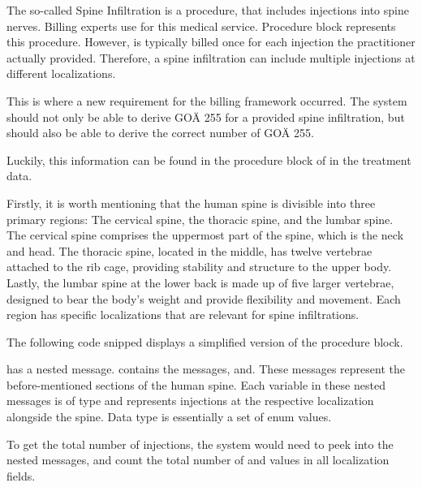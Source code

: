 The so-called Spine Infiltration is a procedure, that includes injections into spine nerves.
Billing experts use  for this medical service.
Procedure block  represents this procedure.
However,  is typically billed once for each injection the practitioner actually provided.
Therefore, a spine infiltration can include multiple injections at different localizations.

This is where a new requirement for the billing framework occurred.
The system should not only be able to derive GOÄ 255 for a provided spine infiltration, but should also be able to derive the correct number of GOÄ 255.

Luckily, this information can be found in the procedure block of in the treatment data.

Firstly, it is worth mentioning that the human spine is divisible into three primary regions:
The cervical spine, the thoracic spine, and the lumbar spine.
The cervical spine comprises the uppermost part of the spine, which is the neck and head.
The thoracic spine, located in the middle, has twelve vertebrae attached to the rib cage, providing stability and structure to the upper body.
Lastly, the lumbar spine at the lower back is made up of five larger vertebrae, designed to bear the body's weight and provide flexibility and movement.
Each region has specific localizations that are relevant for spine infiltrations.

The following code snipped displays a simplified version of the procedure block.



 has a nested message.
 contains the messages, and.
These messages represent the before-mentioned sections of the human spine.
Each variable in these nested messages is of type and represents injections at the respective localization alongside the spine.
Data type is essentially a set of enum values.

To get the total number of injections, the system would need to peek into the nested messages, and count the total number of and values in all localization fields.

